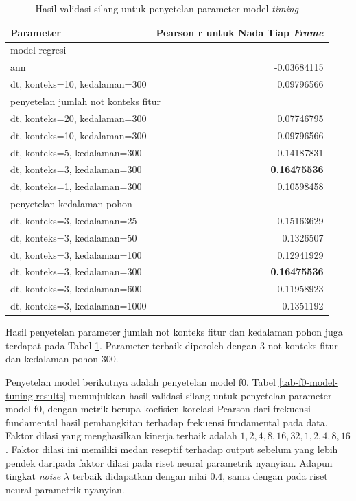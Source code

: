 \begin{table}[htbp]
    \centering
    \caption{Hasil validasi silang untuk penyetelan parameter model \textit{timing}}\label{tab-timing-model-tuning-results}
    \begin{tabular}{ |l|r| } 
     \hline
     Parameter & Pearson r untuk Nada Tiap \textit{Frame} \\
     \hline 
     \multicolumn{2}{|l|}{model regresi}\\ \hline
	 ann    &-0.03684115\\ \hline
	 dt, konteks=10, kedalaman=300     & 0.09796566\\ \hline
	 \multicolumn{2}{|l|}{penyetelan jumlah not konteks fitur}\\ \hline
	 dt, konteks=20, kedalaman=300       &0.07746795\\ \hline
	 dt, konteks=10, kedalaman=300      &0.09796566\\ \hline
	 dt, konteks=5, kedalaman=300     &0.14187831\\ \hline
	 dt, konteks=3, kedalaman=300     &\textbf{0.16475536}\\ \hline
	 dt, konteks=1, kedalaman=300      &0.10598458\\ \hline
	 \multicolumn{2}{|l|}{penyetelan kedalaman pohon}\\ \hline
	 dt, konteks=3, kedalaman=25 	 &0.15163629\\\hline
	 dt, konteks=3, kedalaman=50     &0.1326507\\\hline
	 dt, konteks=3, kedalaman=100      &0.12941929\\\hline
	 dt, konteks=3, kedalaman=300     &\textbf{0.16475536}\\ \hline
	 dt, konteks=3, kedalaman=600     &0.11958923\\\hline
	 dt, konteks=3, kedalaman=1000     &0.1351192   \\  \hline
    \end{tabular}
\end{table}

Hasil penyetelan parameter jumlah not konteks fitur dan kedalaman pohon juga terdapat pada Tabel \ref{tab-timing-model-tuning-results}. Parameter terbaik diperoleh dengan 3 not konteks fitur dan kedalaman pohon 300.

Penyetelan model berikutnya adalah penyetelan model f0. Tabel \ref{tab-f0-model-tuning-results} menunjukkan hasil validasi silang untuk penyetelan parameter model f0, dengan metrik berupa koefisien korelasi Pearson dari frekuensi fundamental hasil pembangkitan terhadap frekuensi fundamental pada data. Faktor dilasi yang menghasilkan kinerja terbaik adalah $1,2,4,8,16,32,1,2,4,8,16$. Faktor dilasi ini memiliki medan reseptif terhadap output sebelum yang lebih pendek daripada faktor dilasi pada riset neural parametrik nyanyian. Adapun tingkat \textit{noise} $\lambda$ terbaik didapatkan dengan nilai $0.4$, sama dengan pada riset neural parametrik nyanyian.

